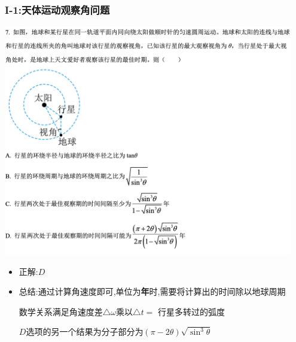 \documentclass{article}
\begin{document}
\subsubsection{I-1:天体运动观察角问题}

\includegraphics[width=0.95\textwidth,keepaspectratio]{./pictures/3.10-1.png}

\begin{itemize}
    \item 正解:\quad $D$
    \item 总结:\quad 通过计算角速度即可,单位为\textbf{年}时,需要将计算出的时间除以地球周期

          \hspace{3.2em}数学关系满足角速度差$\triangle \omega$乘以$\triangle t = $  行星多转过的弧度

          \hspace{3.2em}$D$选项的另一个结果为分子部分为$(\pi - 2 \theta) \sqrt{\sin^3{\theta}}$
\end{itemize}

\vspace{2em}
\end{document}
